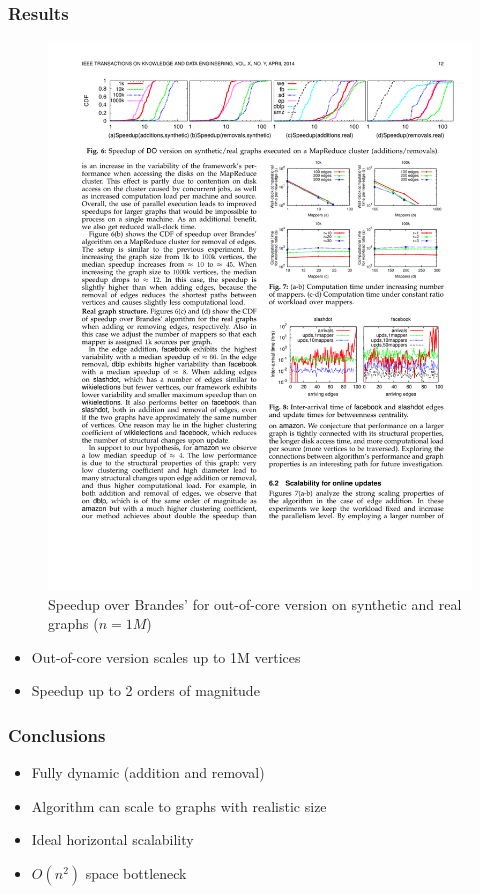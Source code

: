 \begin{frame}
  \frametitle{Results}

  \begin{figure}[t]
    \centering
    \includegraphics[width=\textwidth, height=0.6\textheight, keepaspectratio]{imgs/kdb-results2}
    \caption{Speedup over Brandes' for out-of-core version on synthetic and real graphs ($n = 1M$)}
  \end{figure}

  \begin{itemize}
    \item Out-of-core version scales up to 1M vertices
    \item Speedup up to 2 orders of magnitude
  \end{itemize}

\end{frame}

\begin{frame}
  \frametitle{Conclusions}

  \begin{itemize}
    \item Fully dynamic (addition and removal)
    \item Algorithm can scale to graphs with realistic size
    \item Ideal horizontal scalability
    \item $O(n^2)$ space bottleneck
  \end{itemize}
\end{frame}
